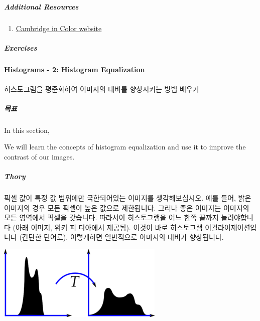 \documentclass[11pt]{article}
\makeatletter
\def\maxwidth{\ifdim\Gin@nat@width>\linewidth\linewidth
    \else\Gin@nat@width\fi}
\let\Oldincludegraphics\includegraphics
\renewcommand{\includegraphics}[1]{\Oldincludegraphics[width=.8\maxwidth]{#1}}
\providecommand{\tightlist}{%
      \setlength{\itemsep}{0pt}\setlength{\parskip}{0pt}}
\makeatother
\begin{document}
    \begin{center}
    \end{center}
    { \hspace*{\fill} \\}
    
    \hypertarget{additional-resources}{%
\subparagraph{Additional Resources}\label{additional-resources}}

\begin{enumerate}
\def\labelenumi{\arabic{enumi}.}
\tightlist
\item
  \href{http://www.cambridgeincolour.com/tutorials/histograms1.htm}{Cambridge
  in Color website}
\end{enumerate}

\hypertarget{exercises}{%
\subparagraph{Exercises}\label{exercises}}

    \hypertarget{histograms---2-histogram-equalization}{%
\paragraph{Histograms - 2: Histogram
Equalization}\label{histograms---2-histogram-equalization}}

히스토그램을 평준화하여 이미지의 대비를 향상시키는 방법 배우기

\hypertarget{uxbaa9uxd45c}{%
\subparagraph{목표}\label{uxbaa9uxd45c}}

In this section,

We will learn the concepts of histogram equalization and use it to
improve the contrast of our images.

\hypertarget{thory}{%
\subparagraph{Thory}\label{thory}}

픽셀 값이 특정 값 범위에만 국한되어있는 이미지를 생각해보십시오. 예를
들어, 밝은 이미지의 경우 모든 픽셀이 높은 값으로 제한됩니다. 그러나 좋은
이미지는 이미지의 모든 영역에서 픽셀을 갖습니다. 따라서이 히스토그램을
어느 한쪽 끝까지 늘려야합니다 (아래 이미지, 위키 피 디아에서 제공됨).
이것이 바로 히스토그램 이퀄라이제이션입니다 (간단한 단어로). 이렇게하면
일반적으로 이미지의 대비가 향상됩니다.

\includegraphics{histogram_equalization.png}
\end{document}
